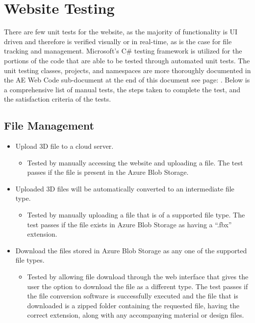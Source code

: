
\section{Website Testing}
There are few unit tests for the website, as the majority of functionality is UI driven and therefore is verified visually or in real-time, as is the case for file tracking and management. 
Microsoft's C\# testing framework is utilized for the portions of the code that are able to be tested through automated unit tests. 
The unit testing classes, projects, and namespaces are more thoroughly documented in the AE Web Code sub-document at the end of this document see page: \pageref{website_CodeDocumentation}.
Below is a comprehensive list of manual tests, the steps taken to complete the test, and the satisfaction criteria of the tests.

\subsection{File Management}
\begin{itemize}
    \item Upload 3D file to a cloud server.
    \begin{itemize}
        \item Tested by manually accessing the website and uploading a file. The test passes if the file is present in the Azure Blob Storage.
    \end{itemize}

    \item Uploaded 3D files will be automatically converted to an intermediate file type.
    \begin{itemize}
        \item Tested by manually uploading a file that is of a supported file type. The test passes if the file exists in Azure Blob Storage as having a ``.fbx'' extension.
    \end{itemize}

    \item Download the files stored in Azure Blob Storage as any one of the supported file types.
    \begin{itemize}
        \item Tested by allowing file download through the web interface that gives the user the option to download the file as a different type. The test passes if the file conversion software is successfully executed and the file that is downloaded is a zipped folder containing the requested file, having the correct extension, along with any accompanying material or design files.
    \end{itemize}

\end{itemize}


